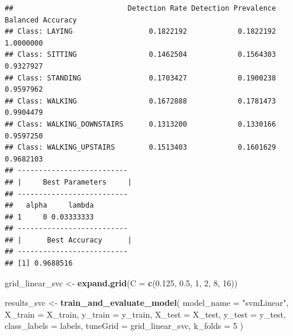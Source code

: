 \documentclass[
]{article}
\newenvironment{Shaded}{\begin{snugshade}}{\end{snugshade}}
\newcommand{\AttributeTok}[1]{\textcolor[rgb]{0.13,0.29,0.53}{#1}}
\newcommand{\DecValTok}[1]{\textcolor[rgb]{0.00,0.00,0.81}{#1}}
\newcommand{\FloatTok}[1]{\textcolor[rgb]{0.00,0.00,0.81}{#1}}
\newcommand{\FunctionTok}[1]{\textcolor[rgb]{0.13,0.29,0.53}{\textbf{#1}}}
\newcommand{\NormalTok}[1]{#1}
\newcommand{\OtherTok}[1]{\textcolor[rgb]{0.56,0.35,0.01}{#1}}
\newcommand{\StringTok}[1]{\textcolor[rgb]{0.31,0.60,0.02}{#1}}
\begin{document}
\begin{verbatim}
##                           Detection Rate Detection Prevalence Balanced Accuracy
## Class: LAYING                  0.1822192            0.1822192         1.0000000
## Class: SITTING                 0.1462504            0.1564303         0.9327927
## Class: STANDING                0.1703427            0.1900238         0.9597962
## Class: WALKING                 0.1672888            0.1781473         0.9904479
## Class: WALKING_DOWNSTAIRS      0.1313200            0.1330166         0.9597250
## Class: WALKING_UPSTAIRS        0.1513403            0.1601629         0.9682103
## --------------------------
## |     Best Parameters     |
## --------------------------
##   alpha     lambda
## 1     0 0.03333333
## --------------------------
## |      Best Accuracy      |
## --------------------------
## [1] 0.9688516
\end{verbatim}

\begin{Shaded}
\begin{Highlighting}[]
\NormalTok{grid\_linear\_svc }\OtherTok{\textless{}{-}} \FunctionTok{expand.grid}\NormalTok{(}\AttributeTok{C =} \FunctionTok{c}\NormalTok{(}\FloatTok{0.125}\NormalTok{, }\FloatTok{0.5}\NormalTok{, }\DecValTok{1}\NormalTok{, }\DecValTok{2}\NormalTok{, }\DecValTok{8}\NormalTok{, }\DecValTok{16}\NormalTok{))}

\NormalTok{results\_svc }\OtherTok{\textless{}{-}} \FunctionTok{train\_and\_evaluate\_model}\NormalTok{(}
  \AttributeTok{model\_name =} \StringTok{"svmLinear"}\NormalTok{,}
  \AttributeTok{X\_train =}\NormalTok{ X\_train, }\AttributeTok{y\_train =}\NormalTok{ y\_train,}
  \AttributeTok{X\_test =}\NormalTok{ X\_test, }\AttributeTok{y\_test =}\NormalTok{ y\_test,}
  \AttributeTok{class\_labels =}\NormalTok{ labels,}
  \AttributeTok{tuneGrid =}\NormalTok{ grid\_linear\_svc,}
  \AttributeTok{k\_folds =} \DecValTok{5}
\NormalTok{)}
\end{Highlighting}
\end{Shaded}
\end{document}
